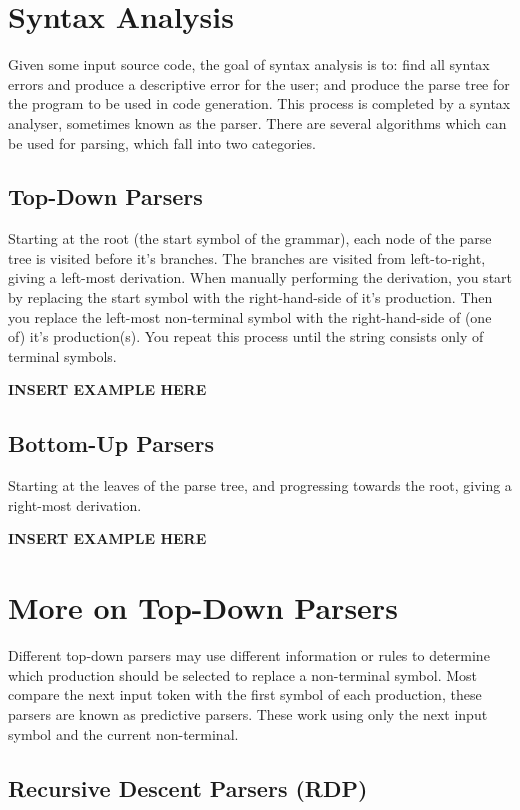 \section*{Syntax Analysis}

Given some input source code, the goal of syntax analysis is to: find all syntax errors and produce a descriptive error
 for the user; and produce the parse tree for the program to be used in code generation. This process is completed by a
 syntax analyser, sometimes known as the parser. There are several algorithms which can be used for parsing, which fall
 into two categories.

\subsection*{Top-Down Parsers}

Starting at the root (the start symbol of the grammar), each node of the parse tree is visited before it's branches.
 The branches are visited from left-to-right, giving a left-most derivation. When manually performing the derivation,
 you start by replacing the start symbol with the right-hand-side of it's production. Then you replace the left-most
 non-terminal symbol with the right-hand-side of (one of) it's production(s). You repeat this process until the string
 consists only of terminal symbols.

\textbf{INSERT EXAMPLE HERE}

\subsection*{Bottom-Up Parsers}

Starting at the leaves of the parse tree, and progressing towards the root, giving a right-most derivation.

\textbf{INSERT EXAMPLE HERE}

\section*{More on Top-Down Parsers}

Different top-down parsers may use different information or rules to determine which production should be selected to
 replace a non-terminal symbol. Most compare the next input token with the first symbol of each production, these
 parsers are known as predictive parsers. These work using only the next input symbol and the current non-terminal.

\subsection*{Recursive Descent Parsers (RDP)}

